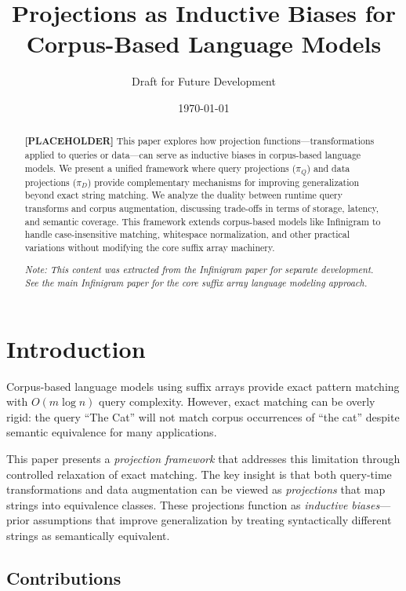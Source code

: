 \documentclass[11pt]{article}
\title{Projections as Inductive Biases for Corpus-Based Language Models}
\author{
  Draft for Future Development
}
\date{\today}
\begin{document}
\maketitle

\begin{abstract}
\textbf{[PLACEHOLDER]} This paper explores how projection functions---transformations applied to queries or data---can serve as inductive biases in corpus-based language models. We present a unified framework where query projections ($\pi_Q$) and data projections ($\pi_D$) provide complementary mechanisms for improving generalization beyond exact string matching. We analyze the duality between runtime query transforms and corpus augmentation, discussing trade-offs in terms of storage, latency, and semantic coverage. This framework extends corpus-based models like Infinigram to handle case-insensitive matching, whitespace normalization, and other practical variations without modifying the core suffix array machinery.

\vspace{1em}
\noindent\textit{Note: This content was extracted from the Infinigram paper for separate development. See the main Infinigram paper for the core suffix array language modeling approach.}
\end{abstract}

\section{Introduction}

Corpus-based language models using suffix arrays \citep{manber1993suffix} provide exact pattern matching with $O(m \log n)$ query complexity. However, exact matching can be overly rigid: the query ``The Cat'' will not match corpus occurrences of ``the cat'' despite semantic equivalence for many applications.

This paper presents a \emph{projection framework} that addresses this limitation through controlled relaxation of exact matching. The key insight is that both query-time transformations and data augmentation can be viewed as \emph{projections} that map strings into equivalence classes. These projections function as \emph{inductive biases}---prior assumptions that improve generalization by treating syntactically different strings as semantically equivalent.

\subsection{Contributions}
\end{document}
